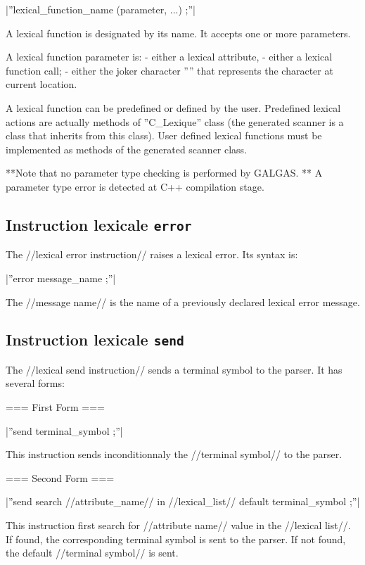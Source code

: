 |''lexical\_function\_name (parameter, ...) ;''|

A lexical function is designated by its name. It accepts one or more parameters.

A lexical function parameter is:
  - either a lexical attribute,
  - either a lexical function call;
  - either the joker character ''\textquotesingle*\textquotesingle'' that represents the character at current location.

A lexical function can be predefined or defined by the user. Predefined lexical actions are actually methods of ''C\_Lexique'' class (the generated scanner is a class that inherits from this class). User defined lexical functions must be implemented as methods of the generated scanner class.

**Note that no parameter type checking is performed by GALGAS. ** A parameter type error is detected at C++ compilation stage.

\subsection{Instruction lexicale \texttt{error}}

The //lexical error instruction// raises a lexical error. Its syntax is:

|''error message\_name ;''|

The //message name// is the name of a previously declared lexical error message.

\subsection{Instruction lexicale \texttt{send}}

The //lexical send instruction// sends a terminal symbol to the parser. It has several forms:

=== First Form ===

|''send terminal\_symbol ;''|

This instruction sends inconditionnaly the //terminal symbol// to the parser.

=== Second Form ===

|''send search //attribute\_name// in //lexical\_list// default terminal\_symbol ;''|

This instruction first search for //attribute name// value in the //lexical list//. If found, the corresponding terminal symbol is sent to the parser. If not found, the default //terminal symbol// is sent.

